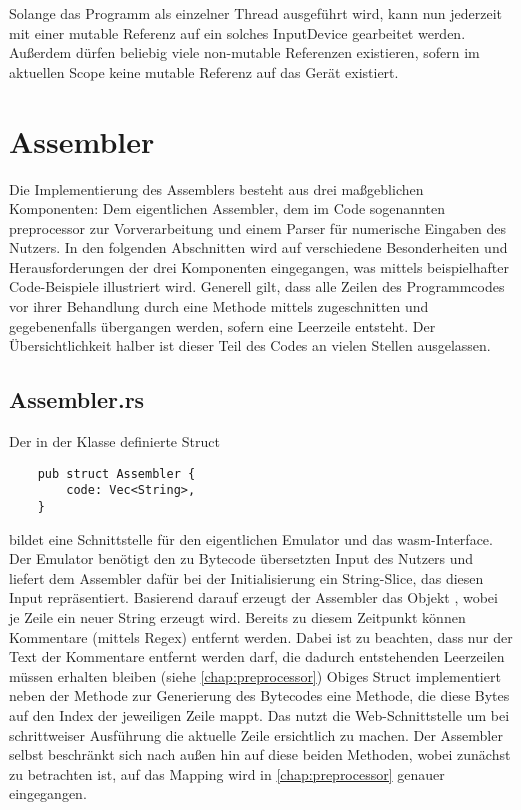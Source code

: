 
Solange das Programm als einzelner Thread ausgeführt wird, kann nun jederzeit mit einer mutable Referenz auf ein solches InputDevice gearbeitet werden. Außerdem dürfen beliebig viele non-mutable Referenzen existieren, sofern im aktuellen Scope keine mutable Referenz auf das Gerät existiert.

\section{Assembler}

Die Implementierung des Assemblers besteht aus drei maßgeblichen Komponenten: Dem eigentlichen Assembler, dem im Code sogenannten \glqq preprocessor\grqq{} zur Vorverarbeitung und einem Parser für numerische Eingaben des Nutzers. In den folgenden Abschnitten wird auf verschiedene Besonderheiten und Herausforderungen der drei Komponenten eingegangen, was mittels beispielhafter Code-Beispiele illustriert wird. Generell gilt, dass alle Zeilen des Programmcodes vor ihrer Behandlung durch eine Methode mittels  zugeschnitten und gegebenenfalls übergangen werden, sofern eine Leerzeile entsteht. Der Übersichtlichkeit halber ist dieser Teil des Codes an vielen Stellen ausgelassen.

\subsection{Assembler.rs}

Der in der Klasse  definierte Struct 
\begin{verbatim}
    pub struct Assembler {
        code: Vec<String>,
    }
\end{verbatim}
bildet eine Schnittstelle für den eigentlichen Emulator und das \ac{wasm}-Interface. Der Emulator benötigt den zu Bytecode übersetzten Input des Nutzers und liefert dem Assembler dafür bei der Initialisierung ein String-Slice, das diesen Input repräsentiert. Basierend darauf erzeugt der Assembler das Objekt , wobei je Zeile ein neuer String erzeugt wird. Bereits zu diesem Zeitpunkt können Kommentare (mittels Regex) entfernt werden. Dabei ist zu beachten, dass nur der Text der Kommentare entfernt werden darf, die dadurch entstehenden Leerzeilen müssen erhalten bleiben (siehe \ref{chap:preprocessor}) Obiges Struct implementiert neben der Methode  zur Generierung des Bytecodes eine Methode, die diese Bytes auf den Index der jeweiligen Zeile mappt. Das nutzt die Web-Schnittstelle um bei schrittweiser Ausführung die aktuelle Zeile ersichtlich zu machen.
Der Assembler selbst beschränkt sich nach außen hin auf diese beiden Methoden, wobei zunächst  zu betrachten ist, auf das Mapping wird in \ref{chap:preprocessor} genauer eingegangen.

